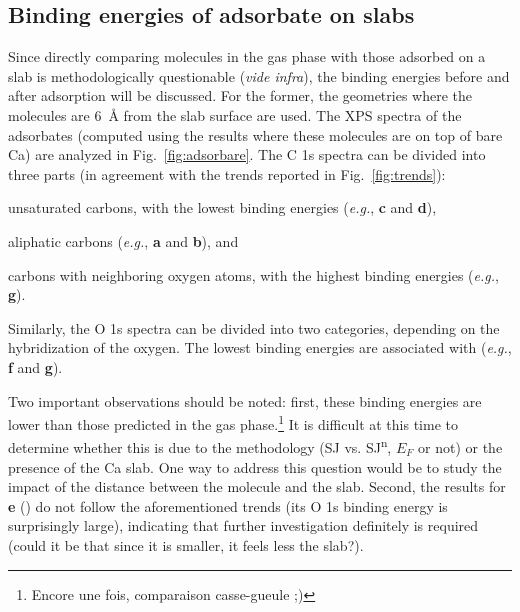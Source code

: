 \documentclass[12pt,a4paper]{article}
\begin{document}
\clearpage
\subsection{Binding energies of adsorbate on slabs}

Since directly comparing molecules in the gas phase with those adsorbed on a slab is methodologically questionable (\textit{vide infra}), the binding energies before and after adsorption will be discussed. For the former, the geometries where the molecules are \SI{6}{\angstrom} from the slab surface are used. The XPS spectra of the adsorbates (computed using the results where these molecules are on top of bare Ca) are analyzed in Fig.~\ref{fig:adsorbare}. The C 1s spectra can be divided into three parts (in agreement with the trends reported in Fig.~\ref{fig:trends}): \begin{inparaenum}[i)]
	\item unsaturated carbons, with the lowest binding energies (\textit{e.g.}, \textbf{c} and \textbf{d}),
	\item aliphatic carbons (\textit{e.g.}, \textbf{a} and \textbf{b}), and
	\item carbons with neighboring oxygen atoms, with the highest binding energies (\textit{e.g.}, \textbf{g}).
\end{inparaenum}
Similarly, the O 1s spectra can be divided into two categories, depending on the hybridization of the oxygen. The lowest binding energies are associated with  (\textit{e.g.}, \textbf{f} and \textbf{g}).

Two important observations should be noted: first, these binding energies are lower than those predicted in the gas phase.\footnote{Encore une fois, comparaison casse-gueule ;)} It is difficult at this time to determine whether this is due to the methodology (SJ vs. SJ\textsuperscript{n}, $E_F$ or not) or the presence of the Ca slab. One way to address this question would be to study the impact of the distance between the molecule and the slab. Second, the results for \textbf{e} () do not follow the aforementioned trends (its O 1s binding energy is surprisingly large), indicating that further investigation definitely is required (could it be that since it is smaller, it feels less the slab?).
\end{document}
